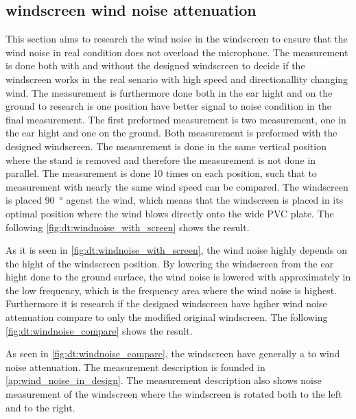 \subsection{windscreen wind noise attenuation}\label{sec:ds:wind_noi_att}
This section aims to research the wind noise in the windscreen to ensure that the wind noise in real condition does not overload the microphone. The measurement is done both with and without the designed windscreen to decide if the windscreen works in the real senario with high speed and directionallity changing wind. The measurement is furthermore done both in the ear hight and on the ground to research is one position have better signal to noise condition in the final measurement. The first preformed measurement is two measurement, one in the ear hight and one on the ground. Both measurement is preformed with the designed windscreen. The measurement is done in the same vertical position where the stand is removed and therefore the measurement is not done in parallel. The measurement is done 10 times on each position, such that to measurement with nearly the same wind speed can be compared. The windscreen is placed \SI{90}{\degree} agenst the wind, which means that the windscreen is placed in its optimal position where the wind blows directly onto the wide PVC plate. The following \autoref{fig:dt:windnoise_with_screen} shows the result.


As it is seen in \autoref{fig:dt:windnoise_with_screen}, the wind noise highly depends on the hight of the windscreen position. By lowering the windscreen from the ear hight done to the ground surface, the wind noise is lowered with approximately  in the low frequency, which is the frequency area where the wind noise is highest. Furthermore it is research if the designed windscreen have hgiher wind noise attenuation compare to only the modified original windscreen. The following \autoref{fig:dt:windnoise_compare} shows the result.
 

As seen in \autoref{fig:dt:windnoise_compare}, the windscreen have generally a  to  wind noise attenuation. The measurement description is founded in \autoref{ap:wind_noise_in_design}. The measurement description also shows noise measurement of the windscreen where the windscreen is rotated both to the left and to the right. 

